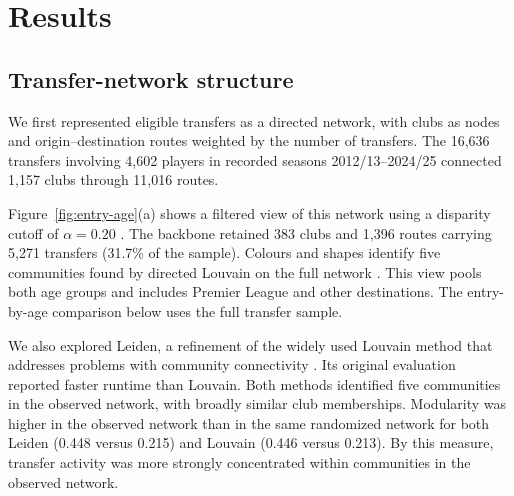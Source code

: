 \section*{Results}

\subsection*{Transfer-network structure}

We first represented eligible transfers as a directed network, with clubs as nodes and origin--destination routes weighted by the number of transfers. The 16,636 transfers involving 4,602 players in recorded seasons 2012/13--2024/25 connected 1,157 clubs through 11,016 routes.

Figure~\ref{fig:entry-age}(a) shows a filtered view of this network using a disparity cutoff of $\alpha = 0.20$ \cite{serrano2009multiscale}. The backbone retained 383 clubs and 1,396 routes carrying 5,271 transfers (31.7\% of the sample). Colours and shapes identify five communities found by directed Louvain on the full network \cite{blondel2008louvain,dugue2015directed}. This view pools both age groups and includes Premier League and other destinations. The entry-by-age comparison below uses the full transfer sample.

We also explored Leiden, a refinement of the widely used Louvain method that addresses problems with community connectivity \cite{traag2019leiden}. Its original evaluation reported faster runtime than Louvain. Both methods identified five communities in the observed network, with broadly similar club memberships. Modularity was higher in the observed network than in the same randomized network for both Leiden (0.448 versus 0.215) and Louvain (0.446 versus 0.213). By this measure, transfer activity was more strongly concentrated within communities in the observed network.


